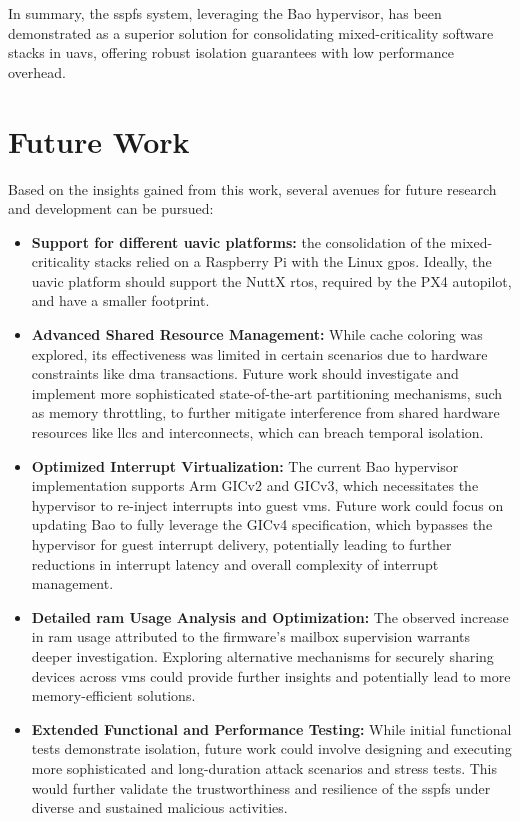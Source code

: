In summary, the \gls{sspfs} system, leveraging the Bao hypervisor, has been
demonstrated as a superior solution for consolidating mixed-criticality software
stacks in \glspl{uav}, offering robust isolation guarantees with low performance
overhead.

\section{Future Work}
Based on the insights gained from this work, several
avenues for future research and development can be
pursued:
\begin{itemize}
\item \textbf{Support for different \gls{uavic} platforms:} the consolidation of
  the mixed-criticality stacks relied on a Raspberry Pi with the Linux
  \gls{gpos}.
  Ideally, the \gls{uavic} platform should support the NuttX \gls{rtos},
  required by the PX4 autopilot, and have a smaller footprint.
\item \textbf{Advanced Shared Resource Management:}
  While cache coloring was explored, its effectiveness was limited in certain
  scenarios due to hardware constraints like \gls{dma} 
  transactions. Future work should investigate and implement more sophisticated
  state-of-the-art partitioning mechanisms, such as memory throttling, to
  further mitigate interference from shared hardware resources like \glspl{llc}
  and interconnects, which can breach temporal isolation.
\item \textbf{Optimized Interrupt Virtualization:} The current Bao hypervisor
  implementation supports Arm GICv2 and GICv3, which necessitates the hypervisor
  to re-inject interrupts into guest \glspl{vm}. Future work could focus on updating
  Bao to fully leverage the GICv4 specification, which bypasses the hypervisor
  for guest interrupt delivery, potentially leading to further reductions in
  interrupt latency and overall complexity of interrupt management.
\item \textbf{Detailed \gls{ram} Usage Analysis and Optimization:} The observed increase
  in \gls{ram} usage attributed to the firmware's mailbox supervision warrants deeper
  investigation. Exploring alternative mechanisms for securely sharing devices
  across \glspl{vm} could provide further insights and potentially lead to more
  memory-efficient solutions.
\item \textbf{Extended Functional and Performance
    Testing:} While initial functional tests demonstrate isolation, future work
  could involve designing and executing more sophisticated and long-duration
  attack scenarios and stress tests. This would further validate the
  trustworthiness and resilience of the \gls{sspfs}  under diverse and sustained
  malicious activities.
\end{itemize}



